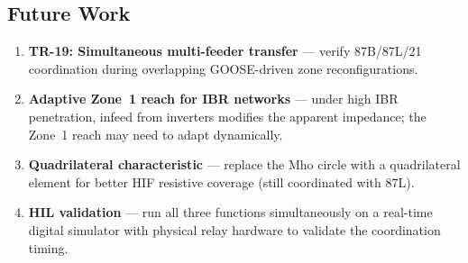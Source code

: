 \documentclass[11pt, a4paper]{article}
\begin{document}
\subsection{Future Work}

\begin{enumerate}
  \item \textbf{TR-19: Simultaneous multi-feeder transfer} --- verify 87B/87L/21
        coordination during overlapping GOOSE-driven zone reconfigurations.
  \item \textbf{Adaptive Zone~1 reach for IBR networks} --- under high IBR
        penetration, infeed from inverters modifies the apparent impedance;
        the Zone~1 reach may need to adapt dynamically.
  \item \textbf{Quadrilateral characteristic} --- replace the Mho circle
        with a quadrilateral element for better HIF resistive coverage
        (still coordinated with 87L).
  \item \textbf{HIL validation} --- run all three functions simultaneously
        on a real-time digital simulator with physical relay hardware to
        validate the coordination timing.
\end{enumerate}




\end{document}
